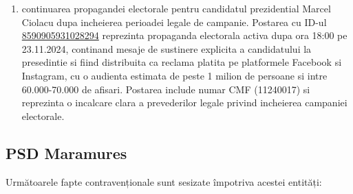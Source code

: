 \documentclass[a4paper,12pt]{article}
\begin{document}
\begin{enumerate}[leftmargin=*, label=\arabic*.)]
    \item continuarea propagandei electorale pentru candidatul prezidential Marcel Ciolacu dupa incheierea perioadei legale de campanie. Postarea cu ID-ul \href{https://www.facebook.com/ads/library/?id=8590905931028294}{8590905931028294} reprezinta propaganda electorala activa dupa ora 18:00 pe 23.11.2024, continand mesaje de sustinere explicita a candidatului la presedintie si fiind distribuita ca reclama platita pe platformele Facebook si Instagram, cu o audienta estimata de peste 1 milion de persoane si intre 60.000-70.000 de afisari. Postarea include numar CMF (11240017) si reprezinta o incalcare clara a prevederilor legale privind incheierea campaniei electorale.
\end{enumerate}

\vspace{0.5cm}

\subsection{PSD Maramures}
Următoarele fapte contravenționale sunt sesizate împotriva acestei entități:
\end{document}

